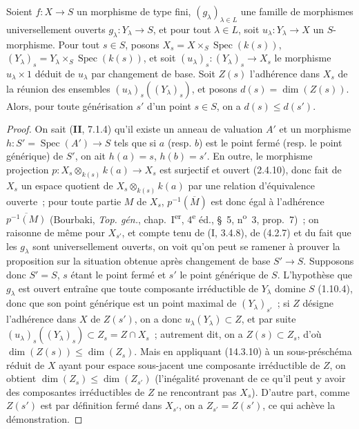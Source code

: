
\begin{proposition}[14.3.11]
\label{IV.14.3.11-fr}
Soient $f:X\to S$ un morphisme de type fini, $(g_\lambda)_{\lambda\in L}$ une
famille de morphismes universellement ouverts $g_\lambda:Y_\lambda\to S$, et pour
tout $\lambda\in L$, soit $u_\lambda:Y_\lambda\to X$ un $S$-morphisme. Pour tout
$s\in S$, posons $X_s=X\times_S\operatorname{Spec}(k(s))$,
$(Y_\lambda)_s=Y_\lambda\times_S\operatorname{Spec}(k(s))$, et soit
$(u_\lambda)_s:(Y_\lambda)_s\to X_s$ le morphisme $u_\lambda\times 1$ déduit de
$u_\lambda$ par changement de base. Soit $Z(s)$ l'adhérence dans $X_s$ de la
réunion des ensembles $(u_\lambda)_s((Y_\lambda)_s)$, et posons
$d(s)=\dim(Z(s))$. Alors, pour toute générisation $s'$ d'un point $s\in S$, on a
$d(s)\leq d(s')$.
\end{proposition}

\begin{proof}
On sait (\textbf{II}, 7.1.4) qu'il existe un anneau de valuation $A'$ et un
morphisme $h:S'=\operatorname{Spec}(A')\to S$ tels que si $a$ (resp. $b$) est le
point fermé (resp. le point générique) de $S'$, on ait $h(a)=s$, $h(b)=s'$. En
outre, le morphisme projection
$p:X_s\otimes_{k(s)}k(a)\to X_s$ est surjectif et ouvert (2.4.10), donc fait de
$X_s$ un espace quotient de $X_s\otimes_{k(s)}k(a)$ par une relation d'équivalence
ouverte~; pour toute partie $M$ de $X_s$, $p^{-1}(\overline M)$ est donc égal à
l'adhérence $\overline{p^{-1}(M)}$ (Bourbaki, \emph{Top. gén.}, chap.~I\textsuperscript{er},
4\textsuperscript{e} éd., \S~5, n\textsuperscript{o}~3, prop.~7)~; on raisonne de
même pour $X_{s'}$, et compte tenu de (I, 3.4.8), de (4.2.7) et du fait que les
$g_\lambda$ sont universellement ouverts, on voit qu'on peut se ramener à prouver
la proposition sur la situation obtenue après changement de base $S'\to S$.
Supposons donc $S'=S$, $s$ étant le point fermé et $s'$ le point générique de $S$.
L'hypothèse que $g_\lambda$ est ouvert entraîne que toute composante irréductible
de $Y_\lambda$ domine $S$ (1.10.4), donc que son point générique est un point
maximal de $(Y_\lambda)_{s'}$~; si $Z$ désigne l'adhérence dans $X$ de $Z(s')$, on
a donc $u_\lambda(Y_\lambda)\subset Z$, et par suite
$(u_\lambda)_s((Y_\lambda)_s)\subset Z_s=Z\cap X_s$~; autrement dit, on a
$Z(s)\subset Z_s$, d'où $\dim(Z(s))\leq\dim(Z_s)$. Mais en appliquant (14.3.10) à
un sous-préschéma réduit de $X$ ayant pour espace sous-jacent une composante
irréductible de $Z$, on obtient $\dim(Z_s)\leq\dim(Z_{s'})$ (l'inégalité provenant
de ce qu'il peut y avoir des composantes irréductibles de $Z$ ne rencontrant pas
$X_s$). D'autre part, comme $Z(s')$ est par définition fermé dans $X_{s'}$, on a
$Z_{s'}=Z(s')$, ce qui achève la démonstration.
\end{proof}


